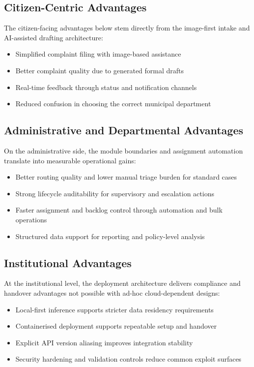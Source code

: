 \subsection{Citizen-Centric Advantages}

The citizen-facing advantages below stem directly from the image-first intake and AI-assisted drafting architecture:

\begin{itemize}
\item Simplified complaint filing with image-based assistance
\item Better complaint quality due to generated formal drafts
\item Real-time feedback through status and notification channels
\item Reduced confusion in choosing the correct municipal department
\end{itemize}

\subsection{Administrative and Departmental Advantages}

On the administrative side, the module boundaries and assignment automation translate into measurable operational gains:

\begin{itemize}
\item Better routing quality and lower manual triage burden for standard cases
\item Strong lifecycle auditability for supervisory and escalation actions
\item Faster assignment and backlog control through automation and bulk operations
\item Structured data support for reporting and policy-level analysis
\end{itemize}

\subsection{Institutional Advantages}

At the institutional level, the deployment architecture delivers compliance and handover advantages not possible with ad-hoc cloud-dependent designs:

\begin{itemize}
\item Local-first inference supports stricter data residency requirements
\item Containerised deployment supports repeatable setup and handover
\item Explicit API version aliasing improves integration stability
\item Security hardening and validation controls reduce common exploit surfaces
\end{itemize}

